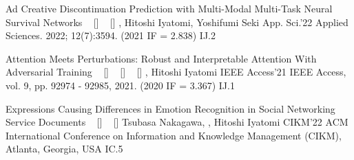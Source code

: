 
\begin{publications}
    \publication
    {Ad Creative Discontinuation Prediction with Multi-Modal Multi-Task Neural Survival Networks}
    {
    ~ [\href{https://doi.org/10.3390/app12073594}{\small{\doiSymbol}}]
    ~ [\href{https://arxiv.org/abs/2204.11588}{\small{\arxivSymbol}}]
    }
    {\underline{}, Hitoshi Iyatomi, Yoshifumi Seki}
    {App. Sci.'22} {Applied Sciences. 2022; 12(7):3594. (2021 IF = 2.838)} {IJ.2}

    \publication
    {Attention Meets Perturbations: Robust and Interpretable Attention With Adversarial Training}
    {
    ~ [\href{https://doi.org/10.1109/ACCESS.2021.3093456}{\small{\doiSymbol}}]
    ~ [\href{https://arxiv.org/abs/2009.12064}{\small{\arxivSymbol}}]
    ~ [\href{https://github.com/shunk031/attention-meets-perturbation}{\small{\githubSymbol}}]
    }
    {\underline{}, Hitoshi Iyatomi}
    {IEEE Access'21} {IEEE Access, vol. 9, pp. 92974 - 92985, 2021. (2020 IF = 3.367)} {IJ.1}

    \publication
    {Expressions Causing Differences in Emotion Recognition in Social Networking Service Documents}
    {
    ~ [\href{https://doi.org/10.1145/3511808.3557599}{\small{\doiSymbol}}]
    ~ [\href{https://arxiv.org/abs/2208.14244}{\small{\arxivSymbol}}]
    }
    {Tsubasa Nakagawa, \underline{}, Hitoshi Iyatomi}
    {CIKM'22} {ACM International Conference on Information and Knowledge Management (CIKM), Atlanta, Georgia, USA} {IC.5}
\end{publications}

